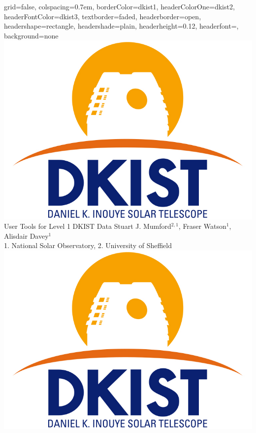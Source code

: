 \documentclass[landscape,a0paper,fontscale=0.32]{baposter}
\begin{document}
\begin{poster}{
 grid=false,
 colspacing=0.7em,
 borderColor=dkist1,
 headerColorOne=dkist2,
 headerFontColor=dkist3,
 textborder=faded,
 headerborder=open,
 headershape=rectangle,
 headershade=plain,
 headerheight=0.12\textheight,
 headerfont={\bfseries},
 background=none
 }
 {
   \includegraphics[height=0.08\textheight]{dkistlogo.jpg}
 }
 {\sc\Huge User Tools for Level 1 DKIST Data}
 {Stuart J. Mumford$^{2,1}$, Fraser Watson$^{1}$, Alisdair Davey$^{1}$\\
 {\footnotesize{1. National Solar Observatory, 2. University of Sheffield}}}
 {
 \includegraphics[height=0.08\textheight]{dkistlogo.jpg}
 }
 


\end{poster}
\end{document}
